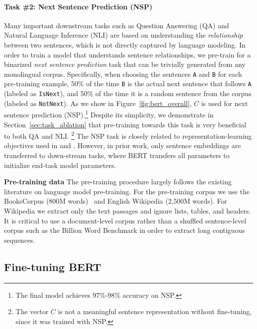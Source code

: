 \paragraph{Task \#2: Next Sentence Prediction (NSP)}
Many important downstream tasks such as Question Answering (QA) and Natural Language Inference (NLI) are based on understanding the {\it relationship} between two sentences, which is not directly captured by language modeling. In order to train a model that understands sentence relationships, we pre-train for a binarized {\it next sentence prediction} task that can be trivially generated from any monolingual corpus. Specifically, when choosing the sentences {\tt A} and {\tt B} for each pre-training example, 50\% of the time {\tt B} is the actual next sentence that follows {\tt A} (labeled
 as {\tt {\small IsNext}}), and 50\% of the time it is a random sentence from the corpus
 (labeled as {\tt {\small NotNext}}). 
As we show in Figure~\ref{fig:bert_overall}, $C$ is used for  next sentence prediction (NSP).\footnote{The final model achieves 97\%-98\% accuracy on NSP.} Despite its simplicity, we demonstrate in Section~\ref{sec:task_ablation} that pre-training towards this task is very beneficial to both QA and NLI.
\footnote{The vector $C$ is not a meaningful sentence representation without fine-tuning, since it was trained with NSP.}
The NSP task is closely related to representation-learning objectives used in \citet{DBLP:journals/corr/JerniteBS17} and \citet{logeswaran2018an}. However, in prior work, only sentence embeddings are transferred to down-stream tasks, where BERT transfers all parameters to initialize end-task model parameters.



\vspace{.3cm}
\noindent\textbf{Pre-training data}
The pre-training procedure largely follows the existing literature on language model pre-training. For the pre-training corpus we use the BooksCorpus (800M words)~\cite{zhu:2015} and English Wikipedia (2,500M words). For Wikipedia we extract only the text passages and ignore lists, tables, and headers. It is critical to use a document-level corpus rather than a shuffled sentence-level corpus such as the Billion Word Benchmark \cite{chelba-etal:2013:_one} in order to extract long contiguous sequences.

\subsection{Fine-tuning BERT}
\label{sec:finetuning_procedure}

